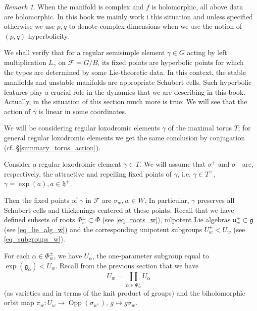 \documentclass[12pt]{amsbook}%
\theoremstyle{definition}
\theoremstyle{remark}
\newtheorem{rem}[thm]{Remark}
\numberwithin{section}{chapter}
\numberwithin{subsection}{section}
\numberwithin{figure}{chapter}
\DeclareMathOperator{\Opp}{Opp}
\def\cF{{\mathscr{F}}}
\def\ga{\gamma}
\def\kap{}
\begin{document}
{{\begin{rem}
When the manifold is complex and $f$ is holomorphic, all above data are holomorphic. In this book we mainly work i this situation and unless specified otherwise we use $p,q$ to denote complex dimensions when we use the notion of $(p,q)$-hyperbolicity.
\end{rem}   
 
\smallskip 
We shall verify that for a regular semisimple element $\gamma \in G$ acting by left multiplication $L_\gamma$ on 
$\cF=G/B$, its fixed points are hyperbolic points for which the types are determined by some Lie-theoretic data. In this context, the stable manifolds and unstable manifolds are appropriate Schubert cells. Such hyperbolic features play a crucial role in the dynamics that we are describing in this book. Actually,  in the situation of this section much more is true: We will see that the action of $\gamma$ is linear in some coordinates.

We will be considering regular loxodromic elements $\ga$ of the maximal torus $T$; 
for general regular loxodromic elements we get the same conclusion by conjugation (cf. \S \ref{summary_torus_action}). 



Consider a regular loxodromic element $\ga\in T$. We will assume that $\sigma^+$ and $\sigma^-$ are, respectively, the attractive and repelling fixed points of $\gamma$, i.e. $\ga\in T^+$, $\ga=\exp(a), a\in {\mathfrak h}^+$.  

Then the fixed points of $\gamma$ in $\cF$ are $\sigma_w, w\in W$. %
In particular, $\gamma$ preserves all Schubert cells and thickenings centered at these points.
Recall that we have defined subsets of roots $\Phi_w^{\pm}\subset \Phi$ (see \eqref{eq_roots_w}), 
nilpotent Lie algebras $\mathfrak{u}_w^{\pm}\subset {\mathfrak g}$ (see \eqref{eq_lie_alg_w}) and the 
corresponding unipotent subgroups $U_w^{\pm}< U_w$ (see \eqref{eq_subgroups_w}). 

For each $\alpha\in \Phi_w^\pm$, we have $U_\alpha$, the one-parameter subgroup equal to 
$\exp({\mathfrak g}_{\alpha})< U_w$. 
Recall from the previous section that we have 
$$
U_w=\prod_{\alpha \in \Phi_w^\pm}U_\alpha$$ 
(as varieties and in terms of the knit product of groups) and the biholomorphic orbit map 
$\pi_w: U_w\rightarrow \Opp(\sigma_{w^\vee})$, $g\mapsto g\sigma_w$. 



}}
\end{document}
